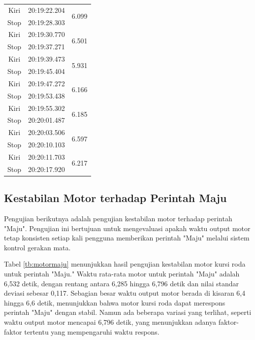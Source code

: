 \begin{longtable}{|c|c|c|}
  Kiri           & 20:19:22.204        & \multirow{2}{*}{6.099}  \\ \cline{1-2}
  Stop           & 20:19:28.303        &                         \\ \hline
  Kiri           & 20:19:30.770        & \multirow{2}{*}{6.501}  \\ \cline{1-2}
  Stop           & 20:19:37.271        &                         \\ \hline
  Kiri           & 20:19:39.473        & \multirow{2}{*}{5.931}  \\ \cline{1-2}
  Stop           & 20:19:45.404        &                         \\ \hline
  Kiri           & 20:19:47.272        & \multirow{2}{*}{6.166}  \\ \cline{1-2}
  Stop           & 20:19:53.438        &                         \\ \hline
  Kiri           & 20:19:55.302        & \multirow{2}{*}{6.185}  \\ \cline{1-2}
  Stop           & 20:20:01.487        &                         \\ \hline
  Kiri           & 20:20:03.506        & \multirow{2}{*}{6.597}  \\ \cline{1-2}
  Stop           & 20:20:10.103        &                         \\ \hline
  Kiri           & 20:20:11.703        & \multirow{2}{*}{6.217}  \\ \cline{1-2}
  Stop           & 20:20:17.920        &                         \\ \hline
\end{longtable}

\subsection{Kestabilan Motor terhadap Perintah Maju}

Pengujian berikutnya adalah pengujian kestabilan motor terhadap perintah "Maju". Pengujian ini bertujuan untuk mengevaluasi apakah waktu output motor tetap konsisten setiap kali pengguna memberikan perintah "Maju" melalui sistem kontrol gerakan mata. 

Tabel \ref{tb:motormaju} menunjukkan hasil pengujian kestabilan motor kursi roda untuk perintah "Maju." Waktu rata-rata motor untuk perintah "Maju" adalah 6,532 detik, dengan rentang antara 6,285 hingga 6,796 detik dan nilai standar deviasi sebesar 0,117. Sebagian besar waktu output motor berada di kisaran 6,4 hingga 6,6 detik, menunjukkan bahwa motor kursi roda dapat merespons perintah "Maju" dengan stabil. Namun ada beberapa variasi yang terlihat, seperti waktu output motor mencapai 6,796 detik, yang menunjukkan adanya faktor-faktor tertentu yang mempengaruhi waktu respons.

